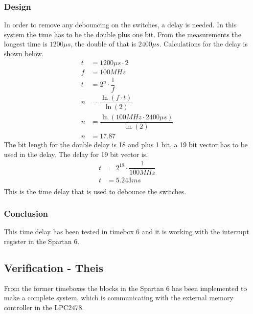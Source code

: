\subsubsection{Design}
%
%
In order to remove any debouncing on the switches, a delay is needed. In this system the time has to be the double plus one bit. From the measurements the longest time is $1200\mu s$, the double of that is $2400\mu s$. Calculations for the delay is shown below.
\begin{align}
	t &=	1200\mu s \cdot 2 \\
	f &=	100MHz\\
	t &=	2^{n}\cdot \dfrac{1}{f}\\
	n &=	\dfrac{\ln(f\cdot t)}{\ln(2)}\\
	n &=	\dfrac{\ln(100MHz\cdot 2400\mu s)}{\ln(2)}\\
	n &=	17.87
\end{align}
The bit length for the double delay is 18 and plus 1 bit, a 19 bit vector has to be used in the delay. The delay for 19 bit vector is.
\begin{align}
	t &=	2^{19}\cdot \dfrac{1}{100MHz}\\
	t &=	5.243 ms\\
\end{align}
This is the time delay that is used to debounce the switches.
\subsubsection{Conclusion}
This time delay has been tested in timebox 6 and it is working with the interrupt register in the Spartan 6.
%
%
%
\subsection{Verification - Theis}
%
From the former timeboxes the blocks in the Spartan 6 has been implemented to make a complete system, which is communicating with the external memory controller in the LPC2478.

